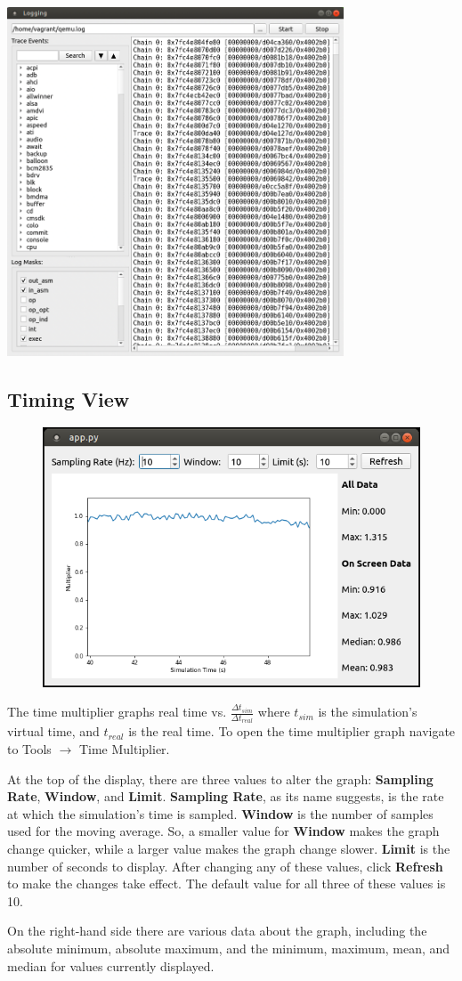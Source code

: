 \documentclass{article}
\begin{document}
\begin{center}
    \includegraphics[width=100mm]{images/logging-view-populated.png}
\end{center}
\subsection{Timing View}
\begin{figure}[h]
    \centering
    \includegraphics[width=.6\textwidth]{images/TimeMult.PNG}
    \label{fig:timemult}
\end{figure}
The time multiplier graphs real time vs. $\frac{\Delta t_{sim}}{\Delta t_{real}}$ where $t_{sim}$ is the simulation's virtual time, and $t_{real}$ is the real time. To open the time multiplier graph navigate to Tools $\rightarrow$ Time Multiplier.\par
At the top of the display, there are three values to alter the graph: \textbf{Sampling Rate}, \textbf{Window}, and \textbf{Limit}. \textbf{Sampling Rate}, as its name suggests, is the rate at which the simulation's time is sampled. \textbf{Window} is the number of samples used for the moving average. So, a smaller value for \textbf{Window} makes the graph change quicker, while a larger value makes the graph change slower. \textbf{Limit} is the number of seconds to display. After changing any of these values, click \textbf{Refresh} to make the changes take effect. The default value for all three of these values is 10.\par
On the right-hand side there are various data about the graph, including the absolute minimum, absolute maximum, and the minimum, maximum, mean, and median for values currently displayed.
\end{document}
